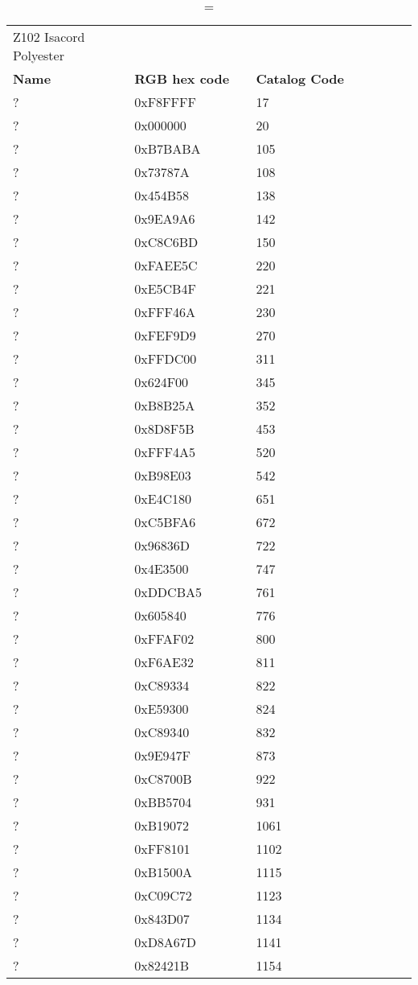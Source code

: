 
\begin{longtable}{p{0.3\linewidth} p{0.3\linewidth} p{0.4\linewidth}}
\caption = {Z102 Isacord Polyester}
\label{tblr:z102}\\
\textbf{Name} & \textbf{RGB hex code} & \textbf{Catalog Code} \\
? & 0xF8FFFF & 17\\
? & 0x000000 & 20\\
? & 0xB7BABA & 105\\
? & 0x73787A & 108\\
? & 0x454B58 & 138\\
? & 0x9EA9A6 & 142\\
? & 0xC8C6BD & 150\\
? & 0xFAEE5C & 220\\
? & 0xE5CB4F & 221\\
? & 0xFFF46A & 230\\
? & 0xFEF9D9 & 270\\
? & 0xFFDC00 & 311\\
? & 0x624F00 & 345\\
? & 0xB8B25A & 352\\
? & 0x8D8F5B & 453\\
? & 0xFFF4A5 & 520\\
? & 0xB98E03 & 542\\
? & 0xE4C180 & 651\\
? & 0xC5BFA6 & 672\\
? & 0x96836D & 722\\
? & 0x4E3500 & 747\\
? & 0xDDCBA5 & 761\\
? & 0x605840 & 776\\
? & 0xFFAF02 & 800\\
? & 0xF6AE32 & 811\\
? & 0xC89334 & 822\\
? & 0xE59300 & 824\\
? & 0xC89340 & 832\\
? & 0x9E947F & 873\\
? & 0xC8700B & 922\\
? & 0xBB5704 & 931\\
? & 0xB19072 & 1061\\
? & 0xFF8101 & 1102\\
? & 0xB1500A & 1115\\
? & 0xC09C72 & 1123\\
? & 0x843D07 & 1134\\
? & 0xD8A67D & 1141\\
? & 0x82421B & 1154\\

\end{longtable}
